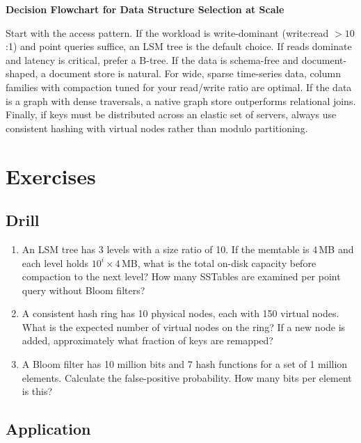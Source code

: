 \begin{center}
\textbf{Decision Flowchart for Data Structure Selection at Scale}
\end{center}

Start with the access pattern.  If the workload is write-dominant
(write:read $> 10$:1) and point queries suffice, an LSM tree is the default choice.
If reads dominate and latency is critical, prefer a B-tree.  If the data is
schema-free and document-shaped, a document store is natural.  For wide, sparse
time-series data, column families with compaction tuned for your read/write ratio
are optimal.  If the data is a graph with dense traversals, a native graph store
outperforms relational joins.  Finally, if keys must be distributed across an
elastic set of servers, always use consistent hashing with virtual nodes rather than
modulo partitioning.

\section{Exercises}

\subsection{Drill}

\begin{enumerate}
    \item An LSM tree has 3 levels with a size ratio of 10.  If the memtable is
    4\,MB and each level holds $10^i \times 4$\,MB, what is the total on-disk
    capacity before compaction to the next level?  How many SSTables are examined
    per point query without Bloom filters?

    \item A consistent hash ring has 10 physical nodes, each with 150 virtual
    nodes.  What is the expected number of virtual nodes on the ring?  If a new
    node is added, approximately what fraction of keys are remapped?

    \item A Bloom filter has 10 million bits and 7 hash functions for a set of
    1 million elements.  Calculate the false-positive probability.  How many bits
    per element is this?
\end{enumerate}

\subsection{Application}

